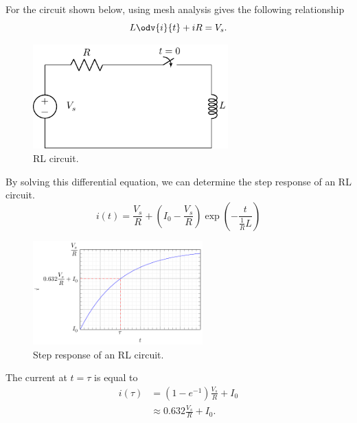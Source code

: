 \documentclass{article}
\begin{document}
\begin{definition}
    For the circuit shown below, using mesh analysis gives the following relationship
    \begin{equation*}
        L\odv{i}{t} + iR = V_s.
    \end{equation*}
    \begin{figure}[H]
        \centering
        \includegraphics[height = 4cm, keepaspectratio = true]{figures/rl_step.pdf}
        \caption{RL circuit.}
    \end{figure}
    By solving this differential equation, we can determine the step response of an
    RL circuit.
    \begin{equation*}
        i(t) = \frac{V_s}{R} + \left(I_0 - \frac{V_s}{R}\right)\exp{\left( -\frac{t}{\frac{1}{R}L} \right)}
    \end{equation*}
    \begin{figure}[H]
        \centering
        \includegraphics[height = 4cm, keepaspectratio = true]{figures/rl_step_plot.pdf}
        \caption{Step response of an RL circuit.}
    \end{figure}
    The current at \(t = \tau\) is equal to
    \begin{align*}
        i(\tau) & = \left( 1 - e^{-1} \right)\frac{V_s}{R} + I_0 \\
                & \approx 0.632\frac{V_s}{R} + I_0.
    \end{align*}
\end{definition}
\newpage
\end{document}
